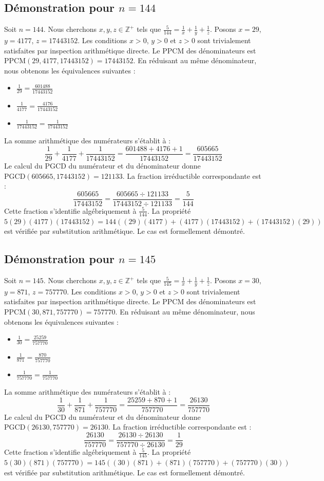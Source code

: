 \documentclass[12pt,a4paper]{article}
\begin{document}
\subsection{Démonstration pour $n = 144$}
Soit $n = 144$. Nous cherchons $x, y, z \in \mathbb{Z}^{+}$ tels que $\frac{5}{144} = \frac{1}{x} + \frac{1}{y} + \frac{1}{z}$.
Posons $x = 29$, $y = 4177$, $z = 17443152$.
Les conditions $x > 0$, $y > 0$ et $z > 0$ sont trivialement satisfaites par inspection arithmétique directe.
Le PPCM des dénominateurs est $\text{PPCM}(29, 4177, 17443152) = 17443152$.
En réduisant au même dénominateur, nous obtenons les équivalences suivantes :
\begin{itemize}
    \item $\frac{1}{29} = \frac{601488}{17443152}$
    \item $\frac{1}{4177} = \frac{4176}{17443152}$
    \item $\frac{1}{17443152} = \frac{1}{17443152}$
\end{itemize}
La somme arithmétique des numérateurs s'établit à :
$$ \frac{1}{29} + \frac{1}{4177} + \frac{1}{17443152} = \frac{601488 + 4176 + 1}{17443152} = \frac{605665}{17443152} $$
Le calcul du PGCD du numérateur et du dénominateur donne $\text{PGCD}(605665, 17443152) = 121133$.
La fraction irréductible correspondante est :
$$ \frac{605665}{17443152} = \frac{605665 \div 121133}{17443152 \div 121133} = \frac{5}{144} $$
Cette fraction s'identifie algébriquement à $\frac{5}{144}$.
La propriété $5(29)(4177)(17443152) = 144((29)(4177) + (4177)(17443152) + (17443152)(29))$ est vérifiée par substitution arithmétique.
Le cas est formellement démontré.

\subsection{Démonstration pour $n = 145$}
Soit $n = 145$. Nous cherchons $x, y, z \in \mathbb{Z}^{+}$ tels que $\frac{5}{145} = \frac{1}{x} + \frac{1}{y} + \frac{1}{z}$.
Posons $x = 30$, $y = 871$, $z = 757770$.
Les conditions $x > 0$, $y > 0$ et $z > 0$ sont trivialement satisfaites par inspection arithmétique directe.
Le PPCM des dénominateurs est $\text{PPCM}(30, 871, 757770) = 757770$.
En réduisant au même dénominateur, nous obtenons les équivalences suivantes :
\begin{itemize}
    \item $\frac{1}{30} = \frac{25259}{757770}$
    \item $\frac{1}{871} = \frac{870}{757770}$
    \item $\frac{1}{757770} = \frac{1}{757770}$
\end{itemize}
La somme arithmétique des numérateurs s'établit à :
$$ \frac{1}{30} + \frac{1}{871} + \frac{1}{757770} = \frac{25259 + 870 + 1}{757770} = \frac{26130}{757770} $$
Le calcul du PGCD du numérateur et du dénominateur donne $\text{PGCD}(26130, 757770) = 26130$.
La fraction irréductible correspondante est :
$$ \frac{26130}{757770} = \frac{26130 \div 26130}{757770 \div 26130} = \frac{1}{29} $$
Cette fraction s'identifie algébriquement à $\frac{5}{145}$.
La propriété $5(30)(871)(757770) = 145((30)(871) + (871)(757770) + (757770)(30))$ est vérifiée par substitution arithmétique.
Le cas est formellement démontré.
\end{document}
